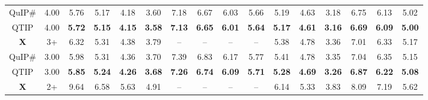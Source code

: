 \begin{table}[t]
\begin{tabular}{@{}cccccccccccccccc@{}}
\rowcolor[HTML]{D9D9D9} 
QuIP\#                            & \multicolumn{1}{c|}{\cellcolor[HTML]{D9D9D9}4.00} & 5.76          & 5.17          & 4.18          & \multicolumn{1}{c|}{\cellcolor[HTML]{D9D9D9}3.60}          & 7.18          & 6.67          & 6.03          & \multicolumn{1}{c|}{\cellcolor[HTML]{D9D9D9}5.66}          & 5.19          & 4.63          & \multicolumn{1}{c|}{\cellcolor[HTML]{D9D9D9}3.18}          & 6.75          & 6.13          & 5.02          \\
\rowcolor[HTML]{D9D9D9} 
QTIP                              & \multicolumn{1}{c|}{\cellcolor[HTML]{D9D9D9}4.00} & \textbf{5.72} & \textbf{5.15} & \textbf{4.15} & \multicolumn{1}{c|}{\cellcolor[HTML]{D9D9D9}\textbf{3.58}} & \textbf{7.13} & \textbf{6.65} & \textbf{6.01} & \multicolumn{1}{c|}{\cellcolor[HTML]{D9D9D9}\textbf{5.64}} & \textbf{5.17} & \textbf{4.61} & \multicolumn{1}{c|}{\cellcolor[HTML]{D9D9D9}\textbf{3.16}} & \textbf{6.69} & \textbf{6.09} & \textbf{5.00} \\
{\color[HTML]{CC0000} \textbf{X}} & \multicolumn{1}{c|}{3+\color{blue}{\textbf{Y}}}                          & 6.32          & 5.31          & 4.38          & \multicolumn{1}{c|}{3.79}                                  & --            & --            & --            & \multicolumn{1}{c|}{--}                                    & 5.38          & 4.78          & \multicolumn{1}{c|}{3.36}                                  & 7.01          & 6.33          & 5.17          \\
QuIP\#                            & \multicolumn{1}{c|}{3.00}                         & 5.98          & 5.31          & 4.36          & \multicolumn{1}{c|}{3.70}                                  & 7.39          & 6.83          & 6.17          & \multicolumn{1}{c|}{5.77}                                  & 5.41          & 4.78          & \multicolumn{1}{c|}{3.35}                                  & 7.04          & 6.35          & 5.15          \\
QTIP                              & \multicolumn{1}{c|}{3.00}                         & \textbf{5.85} & \textbf{5.24} & \textbf{4.26} & \multicolumn{1}{c|}{\textbf{3.68}}                         & \textbf{7.26} & \textbf{6.74} & \textbf{6.09} & \multicolumn{1}{c|}{\textbf{5.71}}                         & \textbf{5.28} & \textbf{4.69} & \multicolumn{1}{c|}{\textbf{3.26}}                         & \textbf{6.87} & \textbf{6.22} & \textbf{5.08} \\
\rowcolor[HTML]{D9D9D9} 
{\color[HTML]{CC0000} \textbf{X}} & \multicolumn{1}{c|}{\cellcolor[HTML]{D9D9D9}2+\color{blue}{\textbf{Y}}}  & 9.64          & 6.58          & 5.63          & \multicolumn{1}{c|}{\cellcolor[HTML]{D9D9D9}4.91}          & --            & --            & --            & \multicolumn{1}{c|}{\cellcolor[HTML]{D9D9D9}--}            & 6.14          & 5.33          & \multicolumn{1}{c|}{\cellcolor[HTML]{D9D9D9}3.83}          & 8.09          & 7.19          & 5.62          \\

\end{tabular}
\end{table}
